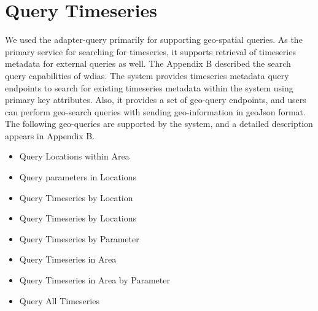 \section{Query Timeseries}
\label{se:query}

We used the adapter-query primarily for supporting geo-spatial queries. As the primary service for searching for timeseries, it supports retrieval of timeseries metadata for external queries as well. The Appendix B described the search query capabilities of \acrshort{wdias}.
The system provides timeseries metadata query endpoints to search for existing timeseries metadata within the system using primary key attributes.
Also, it provides a set of geo-query endpoints, and users can perform geo-search queries with sending geo-information in geoJson format. The following geo-queries are supported by the system, and a detailed description appears in Appendix B.
\begin{itemize}
    \item Query Locations within Area
    \item Query parameters in Locations
    \item Query Timeseries by Location
    \item Query Timeseries by Locations
    \item Query Timeseries by Parameter
    \item Query Timeseries in Area
    \item Query Timeseries in Area by Parameter
    \item Query All Timeseries
\end{itemize}
